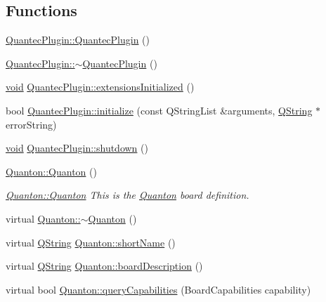 \subsection*{\-Functions}
\begin{DoxyCompactItemize}
\item 
\hyperlink{group___boards___quantec_ga7e395a732723522846429499416b6660}{\-Quantec\-Plugin\-::\-Quantec\-Plugin} ()
\item 
\hyperlink{group___boards___quantec_ga479a3e531eb28d6b2933cba448e348ba}{\-Quantec\-Plugin\-::$\sim$\-Quantec\-Plugin} ()
\item 
\hyperlink{group___u_a_v_objects_plugin_ga444cf2ff3f0ecbe028adce838d373f5c}{void} \hyperlink{group___boards___quantec_ga947364f26b2004a6f8706e053e9200c9}{\-Quantec\-Plugin\-::extensions\-Initialized} ()
\item 
bool \hyperlink{group___boards___quantec_ga74803b604ba599f20ee7a45dddbd7ead}{\-Quantec\-Plugin\-::initialize} (const \-Q\-String\-List \&arguments, \hyperlink{group___u_a_v_objects_plugin_gab9d252f49c333c94a72f97ce3105a32d}{\-Q\-String} $\ast$error\-String)
\item 
\hyperlink{group___u_a_v_objects_plugin_ga444cf2ff3f0ecbe028adce838d373f5c}{void} \hyperlink{group___boards___quantec_ga775ecc021e3638b3652f5e49edd2f748}{\-Quantec\-Plugin\-::shutdown} ()
\item 
\hyperlink{group___boards___quantec_ga39ce601b1744d463fc4a56681c46135f}{\-Quanton\-::\-Quanton} ()
\begin{DoxyCompactList}\small\item\em \hyperlink{group___boards___quantec_ga39ce601b1744d463fc4a56681c46135f}{\-Quanton\-::\-Quanton} \-This is the \hyperlink{class_quanton}{\-Quanton} board definition. \end{DoxyCompactList}\item 
virtual \hyperlink{group___boards___quantec_ga8fdeca3eefac72603d963569a4ef7a5d}{\-Quanton\-::$\sim$\-Quanton} ()
\item 
virtual \hyperlink{group___u_a_v_objects_plugin_gab9d252f49c333c94a72f97ce3105a32d}{\-Q\-String} \hyperlink{group___boards___quantec_gab687582af9051f5955c3c797244dcb64}{\-Quanton\-::short\-Name} ()
\item 
virtual \hyperlink{group___u_a_v_objects_plugin_gab9d252f49c333c94a72f97ce3105a32d}{\-Q\-String} \hyperlink{group___boards___quantec_gae3241fa8f27da1d6e9e01e92be744d71}{\-Quanton\-::board\-Description} ()
\item 
virtual bool \hyperlink{group___boards___quantec_gafceea1eeec5e241c7526b8217b6d9ff9}{\-Quanton\-::query\-Capabilities} (\-Board\-Capabilities capability)

\end{DoxyCompactItemize}
